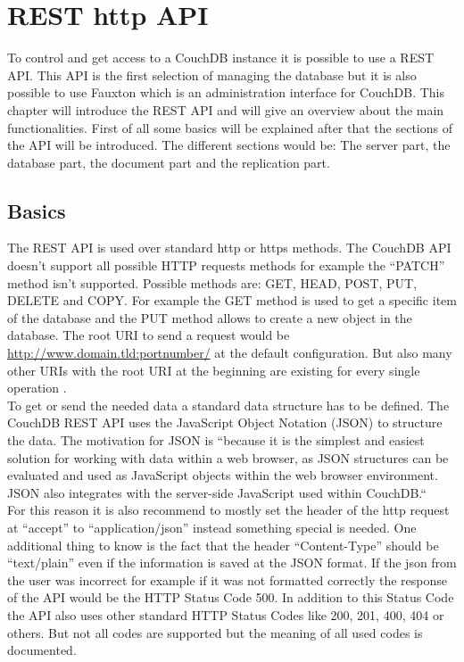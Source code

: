 \section{REST http API}


To control and get access to a CouchDB instance it is possible to use a REST API. This API is the first selection of managing the database but it is also possible to use Fauxton which is an administration interface for CouchDB. This chapter will introduce the REST API and will give an overview about the main functionalities. First of all some basics will be explained after that the sections of the API will be introduced. The different sections would be: The server part, the database part, the document part and the replication part.

\subsection{Basics}

The REST API is used over standard http or https methods. The CouchDB API doesn’t support all possible HTTP requests methods for example the “PATCH” method isn’t supported. Possible methods are: GET, HEAD, POST, PUT, DELETE and COPY. For example the GET method is used to get a specific item of the database and the PUT method allows to create a new object in the database. The root URI to send a request would be \url{http://www.domain.tld:portnumber/}  at the default configuration. But also many other URIs with the root URI at the beginning are existing for every single operation \cite{CouchDBRestRFCPatch, CouchDBRestBasic}. \\
To get or send the needed data a standard data structure has to be defined. The CouchDB REST API uses the JavaScript Object Notation (JSON) to structure the data. The motivation for JSON is “because it is the simplest and easiest solution for working with data within a web browser, as JSON structures can be evaluated and used as JavaScript objects within the web browser environment. JSON also integrates with the server-side JavaScript used within CouchDB.“ \cite{CouchDBRestJson}  \\
For this reason it is also recommend to mostly set the header of the http request at “accept” to “application/json” instead something special is needed. One additional thing to know is the fact that the header “Content-Type” should be “text/plain” even if the information is saved at the JSON format. If the json from the user was incorrect for example if it was not formatted correctly the response of the API would be the HTTP Status Code 500. In addition to this Status Code the API also uses other standard HTTP Status Codes like 200, 201, 400, 404 or others. But not all codes are supported but the meaning of all used codes is documented\cite{CouchDBRestBasic}.

